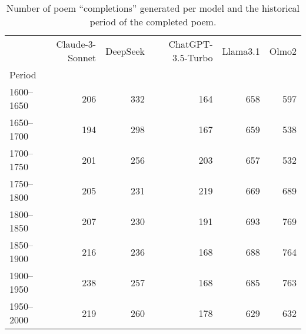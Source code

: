 \begin{table}[H]
  \centering
  \small
  \singlespacing
  \begin{tabular}{lrrrrr}
  \toprule
   & Claude-3-Sonnet & DeepSeek & ChatGPT-3.5-Turbo & Llama3.1 & Olmo2 \\
  Period &  &  &  &  &   \\
  \midrule
  1600--1650 & 206 & 332 & 164 & 658 & 597 \\
  1650--1700 & 194 & 298 & 167 & 659 & 538 \\
  1700--1750 & 201 & 256 & 203 & 657 & 532 \\
  1750--1800 & 205 & 231 & 219 & 669 & 689 \\
  1800--1850 & 207 & 230 & 191 & 693 & 769 \\
  1850--1900 & 216 & 236 & 168 & 688 & 764 \\
  1900--1950 & 238 & 257 & 168 & 685 & 763 \\
  1950--2000 & 219 & 260 & 178 & 629 & 632 \\
  \bottomrule
  \end{tabular}
  \caption{Number of poem ``completions'' generated per model and the historical period of the completed poem.}
  \label{tab:num_poems_completed_models}
\end{table}